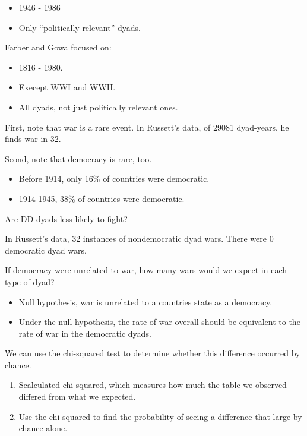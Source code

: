 \documentclass{article}
\begin{document}
\begin{itemize}
  \item 1946 - 1986
  \item Only ``politically relevant'' dyads.
\end{itemize}

Farber and Gowa focused on:

\begin{itemize}
  \item 1816 - 1980.
  \item Execept WWI and WWII.
  \item All dyads, not just politically relevant ones.
\end{itemize}

First, note that war is a rare event.  In Russett's data, of 29081 dyad-years, he finds war in 32.

Scond, note that democracy is rare, too.

\begin{itemize}
  \item Before 1914, only 16\% of countries were democratic.
  \item 1914-1945, 38\% of countries were democratic.
\end{itemize}

Are DD dyads less likely to fight?

In Russett's data, 32 instances of nondemocratic dyad wars.  There were 0 democratic dyad wars.

If democracy were unrelated to war, how many wars would we expect in each type of dyad?

\begin{itemize}
  \item Null hypothesis, war is unrelated to a countries state as a democracy.
  \item Under the null hypothesis, the rate of war overall should be equivalent to the rate of war in the democratic dyads.
\end{itemize}

We can use the chi-squared test to determine whether this difference occurred by chance.

\begin{enumerate}
  \item Scalculated chi-squared, which measures how much the table we observed differed from what we expected.
  \item Use the chi-squared to find the probability of seeing a difference that large by chance alone.
\end{enumerate}
\end{document}
